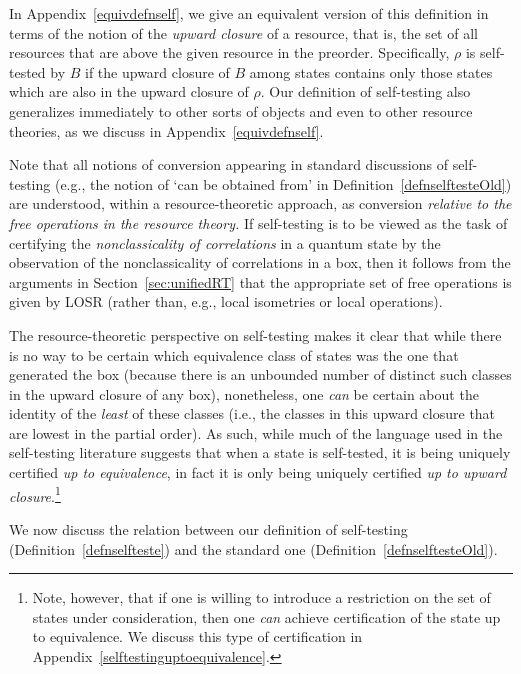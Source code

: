 \documentclass[prx,11pt,letterpaper,twocolumn,accepted=2023-11-27]{quantumarticle}
\theoremstyle{plain}
\theoremstyle{definition}
\begin{document}
In Appendix~\ref{equivdefnself}, we give an equivalent version of this definition in terms of the notion of the \emph{upward closure} of a resource, that is, the set of all resources that are above the given resource in the preorder. Specifically, $\rho$ is self-tested by $B$ if the upward closure of $B$ among states contains only those states which are also in the upward closure of $\rho$. 
Our definition of self-testing also generalizes immediately to other sorts of objects and even to other resource theories, as we discuss in Appendix~\ref{equivdefnself}.


Note that all notions of conversion appearing in standard discussions of self-testing (e.g., the notion of `can be obtained from' in Definition~\ref{defnselftesteOld})
 are understood, within a resource-theoretic approach, as conversion {\em relative to the free operations in the resource theory.}
If self-testing is to be viewed as the task of certifying the {\em nonclassicality of correlations} in a quantum state by the observation of the nonclassicality of correlations in a box,
 then it follows from the arguments in Section~\ref{sec:unifiedRT} that the appropriate set of free operations is given by LOSR (rather than, e.g., local isometries or local operations).

The resource-theoretic perspective on self-testing makes it clear that while there is no way to be certain which equivalence class of states was the one that generated the box (because there is an unbounded number of distinct such classes in the upward closure of any box), nonetheless, one {\em can} be certain about the identity of the {\em least} of these classes (i.e., the classes in this upward closure that are lowest in the partial order). 
 As such, while much of the language used in the self-testing literature suggests that when a state is self-tested, it is being uniquely certified 
  {\em up to equivalence}, in fact it is only being uniquely certified 
  {\em up to upward closure}.\footnote{Note, however, that if one is willing to introduce a restriction on the set of states under consideration, then one {\em can} achieve certification of the state up to equivalence.  We discuss this type of certification in Appendix~\ref{selftestinguptoequivalence}.} 

  
We now discuss the relation between our definition of self-testing (Definition~\ref{defnselfteste}) and the standard one (Definition~\ref{defnselftesteOld}).
\end{document}
